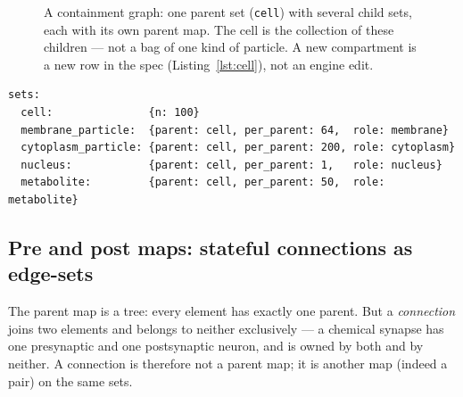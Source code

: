 \documentclass[11pt]{article}
\newcommand{\code}[1]{\texttt{#1}}
\begin{document}
\begin{figure}[h]
\centering
{}
\caption{A containment graph: one parent set (\code{cell}) with several child
sets, each with its own parent map. The cell is the collection of these children
--- not a bag of one kind of particle. A new compartment is a new row in the spec
(Listing~\ref{lst:cell}), not an engine edit.}
\label{fig:graph}
\end{figure}

\begin{lstlisting}[style=yaml,caption={A cell as a collection of child sets: each compartment is its own set with a parent map.},label=lst:cell]
sets:
  cell:               {n: 100}
  membrane_particle:  {parent: cell, per_parent: 64,  role: membrane}
  cytoplasm_particle: {parent: cell, per_parent: 200, role: cytoplasm}
  nucleus:            {parent: cell, per_parent: 1,   role: nucleus}
  metabolite:         {parent: cell, per_parent: 50,  role: metabolite}
\end{lstlisting}

\subsection*{Pre and post maps: stateful connections as edge-sets}
\label{sec:incidence}

The parent map is a tree: every element has exactly one parent. But a
\emph{connection} joins two elements and belongs to neither exclusively --- a
chemical synapse has one presynaptic and one postsynaptic neuron, and is owned by
both and by neither. A connection is therefore not a parent map; it is another map
(indeed a pair) on the same sets.
\end{document}
